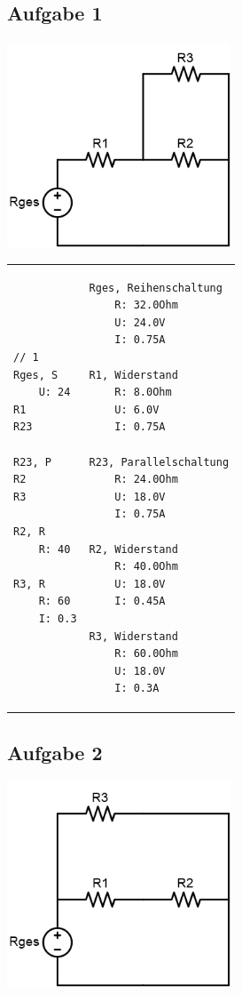 \documentclass[a4paper,10pt,ngerman]{scrartcl}
\begin{document}
\subsection{Aufgabe 1}

\includegraphics[width=0.5\textwidth]{circuit3.png}

\begin{tabular}{p{}p{}}
\raggedright
\begin{verbatim}
// 1
Rges, S
    U: 24
R1
R23

R23, P
R2
R3

R2, R
    R: 40

R3, R
    R: 60
    I: 0.3
\end{verbatim}   &
\raggedleft
\begin{verbatim}
Rges, Reihenschaltung
    R: 32.0Ohm
    U: 24.0V
    I: 0.75A

R1, Widerstand
    R: 8.0Ohm
    U: 6.0V
    I: 0.75A

R23, Parallelschaltung
    R: 24.0Ohm
    U: 18.0V
    I: 0.75A

R2, Widerstand
    R: 40.0Ohm
    U: 18.0V
    I: 0.45A

R3, Widerstand
    R: 60.0Ohm
    U: 18.0V
    I: 0.3A
\end{verbatim}
\end{tabular}

\subsection{Aufgabe 2}

\includegraphics[width=0.5\textwidth]{circuit4.png}
\end{document}
